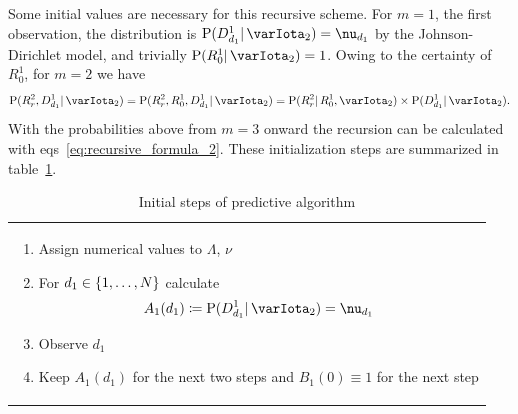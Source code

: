 \documentclass[\ifafour a4paper,12pt,\else a5paper,10pt,\fi%
onecolumn,oneside,article,%
british%
]{memoir}
\theoremstyle{remark}
\theoremstyle{innote}
\newcommand*{\defd}{\coloneqq}
\DeclarePairedDelimiter\set{\{}{\}}
\newcommand*{\p}{\mathrm{P}}%
\renewcommand*{\|}{\mathpunct{|}}
\newcommand*{\eqns}{eqs}%
\newcommand*{\yI}{\varIota}
\newcommand*{\yMc}{\yI_2}
\newcommand*{\yN}{\varLambda}
\newcommand*{\ynn}{\nu}
\begin{document}
Some initial values are necessary for this recursive scheme. For $m=1$, the
first observation, the distribution is $\p(D^{1}_{d_1} \| \yMc)=\ynn_{d_1}$
by the Johnson-Dirichlet model, and trivially $\p(R^{1}_{0} \| \yMc)=1$.
Owing to the certainty of $R^1_0$, for $m=2$ we have
\begin{equation}
  \label{eq:initial_R2}
  \p(R^{2}_{r}, D^{1}_{d_{1}} \|  \yMc)
  = \p(R^{2}_{r},R^{1}_{0}, D^{1}_{d_{1}} \|  \yMc)
  = \p(R^{2}_{r} \| R^{1}_{0},  \yMc) \times
  \p( D^{1}_{d_{1}} \|  \yMc).
\end{equation}
With the probabilities above from $m=3$ onward the recursion can be
calculated with \eqns~\eqref{eq:recursive_formula_2}. These initialization
steps are summarized in table~\ref{tab:adamsetal_initial}.

\begin{table}[!p]
  \centering
  \caption{Initial steps of predictive algorithm}
  \label{tab:adamsetal_initial}
  \begin{tabularx}{\textwidth}{X}\hline
    \begin{enumerate}%
    \item Assign numerical values to $\yN$, $\ynn$
    \item For $d_1 \in \set{1,\dotsc,N}$ calculate
      \[A_1(d_1)\defd \p(D^{1}_{d_{1}} \|  \yMc) =\ynn_{d_1} \]
    \item Observe $d_1$
    \item Keep  $A_1(d_1)$ for the next two steps and $B_1(0)\equiv 1$ for
      the next step


\end{enumerate}
\end{tabularx}
\end{table}
\end{document}
